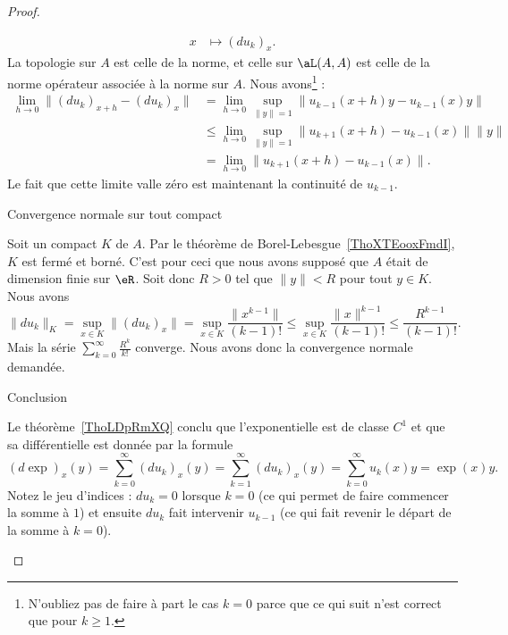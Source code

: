\begin{proof}
\begin{subproof}
\begin{equation}
\begin{aligned}
                    x&\mapsto (du_k)_x.
                \end{aligned}
            \end{equation}
            La topologie sur \( A\) est celle de la norme, et celle sur \( \aL(A,A)\) est celle de la norme opérateur associée à la norme sur $A$. Nous avons\footnote{N'oubliez pas de faire à part le cas \( k=0\) parce que ce qui suit n'est correct que pour \( k\geq 1\).} :
            \begin{subequations}
                \begin{align}
                    \lim_{h\to 0} \| (du_k)_{x+h}-(du_k)_x \|&=\lim_{h\to 0} \sup_{\| y \|=1}\| u_{k-1}(x+h)y-u_{k-1}(x)y \|\\
                    &\leq\lim_{h\to 0} \sup_{\| y \|=1}\| u_{k+1}(x+h)-u_{k-1}(x) \|\| y \|\\
                    &=\lim_{h\to 0} \| u_{k+1}(x+h)-u_{k-1}(x) \|.
                \end{align}
            \end{subequations}
            Le fait que cette limite valle zéro est maintenant la continuité de \( u_{k-1}\).

        \item[Convergence normale sur tout compact]

            Soit un compact \( K\) de \( A\). Par le théorème de Borel-Lebesgue~\ref{ThoXTEooxFmdI}, \( K\) est fermé et borné. C'est pour ceci que nous avons supposé que \( A\) était de dimension finie sur \( \eR\). Soit donc \( R>0\) tel que \( \| y \|<R\) pour tout \( y\in K\). Nous avons
            \begin{equation}
                \| du_k \|_K=\sup_{x\in K}\| (du_k)_x \|=\sup_{x\in K}\frac{ \| x^{k-1} \| }{ (k-1)! }\leq \sup_{x\in K}\frac{ \| x \|^{k-1} }{ (k-1)! }\leq \frac{ R^{k-1} }{ (k-1)! }.
            \end{equation}
            Mais la série \( \sum_{k=0}^{\infty}\frac{ R^k }{k!}\) converge. Nous avons donc la convergence normale demandée.

        \item[Conclusion]

            Le théorème~\ref{ThoLDpRmXQ} conclu que l'exponentielle est de classe \( C^1\) et que sa différentielle est donnée par la formule
            \begin{equation}
                (d\exp)_x(y)=\sum_{k=0}^{\infty}(du_k)_x(y)=\sum_{k=1}^{\infty}(du_k)_x(y)=\sum_{k=0}^{\infty}u_k(x)y=\exp(x)y.
            \end{equation}
            Notez le jeu d'indices : \( du_k=0\) lorsque \( k=0\) (ce qui permet de faire commencer la somme à \( 1\)) et ensuite \( du_k\) fait intervenir \( u_{k-1}\) (ce qui fait revenir le départ de la somme à \( k=0\)).

    \end{subproof}
\end{proof}

